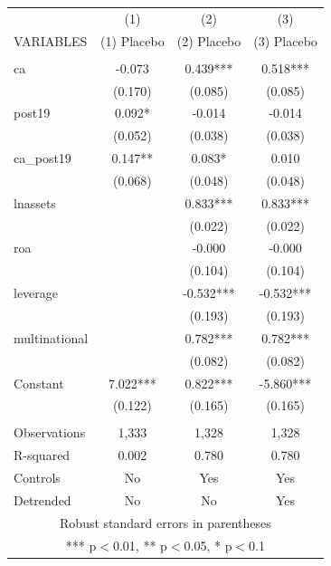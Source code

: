 \begin{tabular}{lccc} \hline
 & (1) & (2) & (3) \\
VARIABLES & (1) Placebo & (2) Placebo & (3) Placebo \\ \hline
 &  &  &  \\
ca & -0.073 & 0.439*** & 0.518*** \\
 & (0.170) & (0.085) & (0.085) \\
post19 & 0.092* & -0.014 & -0.014 \\
 & (0.052) & (0.038) & (0.038) \\
ca\_post19 & 0.147** & 0.083* & 0.010 \\
 & (0.068) & (0.048) & (0.048) \\
lnassets &  & 0.833*** & 0.833*** \\
 &  & (0.022) & (0.022) \\
roa &  & -0.000 & -0.000 \\
 &  & (0.104) & (0.104) \\
leverage &  & -0.532*** & -0.532*** \\
 &  & (0.193) & (0.193) \\
multinational &  & 0.782*** & 0.782*** \\
 &  & (0.082) & (0.082) \\
Constant & 7.022*** & 0.822*** & -5.860*** \\
 & (0.122) & (0.165) & (0.165) \\
 &  &  &  \\
Observations & 1,333 & 1,328 & 1,328 \\
R-squared & 0.002 & 0.780 & 0.780 \\
Controls & No & Yes & Yes \\
 Detrended & No & No & Yes \\ \hline
\multicolumn{4}{c}{ Robust standard errors in parentheses} \\
\multicolumn{4}{c}{ *** p$<$0.01, ** p$<$0.05, * p$<$0.1} \\
\end{tabular}
